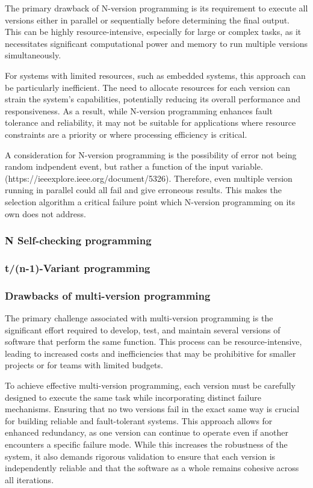 \documentclass[12pt, letterpaper]{article}
\begin{document}
The primary drawback of N-version programming is its requirement to execute all versions either in parallel or sequentially before determining the final output. This can be highly resource-intensive, especially for large or complex tasks, as it necessitates significant computational power and memory to run multiple versions simultaneously.

For systems with limited resources, such as embedded systems, this approach can be particularly inefficient. The need to allocate resources for each version can strain the system’s capabilities, potentially reducing its overall performance and responsiveness. As a result, while N-version programming enhances fault tolerance and reliability, it may not be suitable for applications where resource constraints are a priority or where processing efficiency is critical.

A consideration for N-version programming is the possibility of error not being random indpendent event, but rather a function of the input variable. (https://ieeexplore.ieee.org/document/5326). Therefore, even multiple version running in parallel could all fail and give erroneous results. This makes the selection algorithm a critical failure point which N-version programming on its own does not address.

\subsubsection{N Self-checking programming}

\subsubsection{t/(n-1)-Variant programming}

\subsubsection{Drawbacks of multi-version programming}

The primary challenge associated with multi-version programming is the significant effort required to develop, test, and maintain several versions of software that perform the same function. This process can be resource-intensive, leading to increased costs and inefficiencies that may be prohibitive for smaller projects or for teams with limited budgets.

To achieve effective multi-version programming, each version must be carefully designed to execute the same task while incorporating distinct failure mechanisms. Ensuring that no two versions fail in the exact same way is crucial for building reliable and fault-tolerant systems. This approach allows for enhanced redundancy, as one version can continue to operate even if another encounters a specific failure mode. While this increases the robustness of the system, it also demands rigorous validation to ensure that each version is independently reliable and that the software as a whole remains cohesive across all iterations.

\printbibliography
\end{document}

